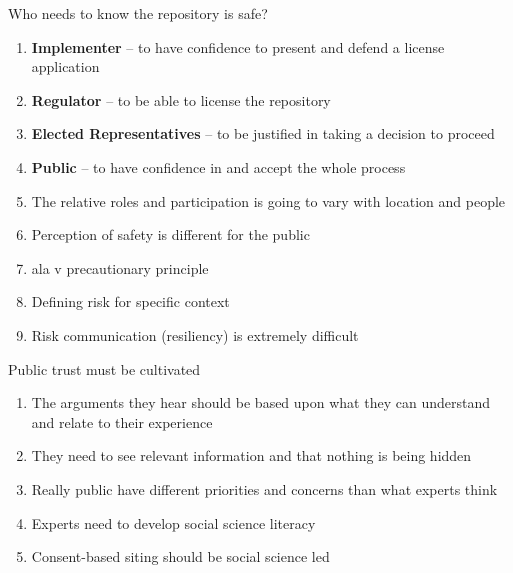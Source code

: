 \documentclass[aspectratio=1610,pdftex,dvipsnames,compress,xcolor={dvipsnames}]{beamer}
\newcommand{\acs}{\acrshort} %
\begin{document}
\begin{frame}{Who needs to know the repository is safe?}
    \begin{enumerate}[series=outerlist,topsep=0pt,itemsep=11pt,leftmargin=*,label=(\arabic*)]
        \item[]\textbf{Implementer} -- to have confidence to present and defend a license application
        \item[]\textbf{Regulator} -- to be able to license the repository
        \item[]\textbf{Elected Representatives} -- to be justified in taking a decision to proceed
        \item[]\textbf{Public} -- to have confidence in and accept the whole process
        \item[]The relative roles and participation is going to vary with location and people
        \item[]Perception of safety is different for the public
        \item[]\acs{ala} v precautionary principle
        \item[]Defining risk for specific context
        \item[]Risk communication (resiliency) is extremely difficult
    \end{enumerate}
\end{frame}


\begin{frame}{Public trust must be cultivated}
    \begin{enumerate}[series=outerlist,topsep=0pt,itemsep=21pt,leftmargin=*,label=(\arabic*)]
        \item[]The arguments they hear should be based upon what they can understand and relate to their experience
        \item[]They need to see relevant information and that nothing is being hidden
        \item[]Really public have different priorities and concerns than what experts think
        \item[]Experts need to develop social science literacy
        \item[]Consent-based siting should be social science led
    \end{enumerate}
\end{frame}
\end{document}
